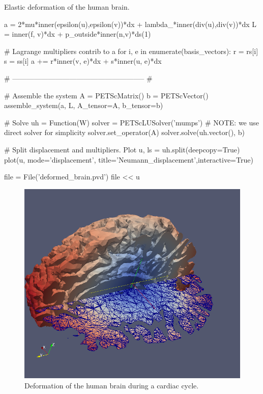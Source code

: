 \begin{example}{Elastic deformation of the human brain.}
\begin{python}
a = 2*mu*inner(epsilon(u),epsilon(v))*dx + lambda_*inner(div(u),div(v))*dx
L = inner(f, v)*dx + p_outside*inner(n,v)*ds(1)

# Lagrange multipliers contrib to a
for i, e in enumerate(basis_vectors):
	r = rs[i]
	s = ss[i]
	a += r*inner(v, e)*dx + s*inner(u, e)*dx

# -------------------------------------------------------- #

# Assemble the system
A = PETScMatrix()
b = PETScVector()
assemble_system(a, L, A_tensor=A, b_tensor=b)

# Solve
uh = Function(W)
solver = PETScLUSolver('mumps') # NOTE: we use direct solver for simplicity
solver.set_operator(A)
solver.solve(uh.vector(), b)

# Split displacement and multipliers. Plot
u, ls = uh.split(deepcopy=True) 
plot(u, mode='displacement', title='Neumann_displacement',interactive=True)

file = File('deformed_brain.pvd')
file << u 

\end{python}
\end{example}

\begin{figure}[h!] 
\begin{center}
  \includegraphics[scale=0.25]{chapters/elasticity/screen_shot.png}
  \end{center}
\caption{Deformation of the human brain during a cardiac cycle.}
\end{figure}


